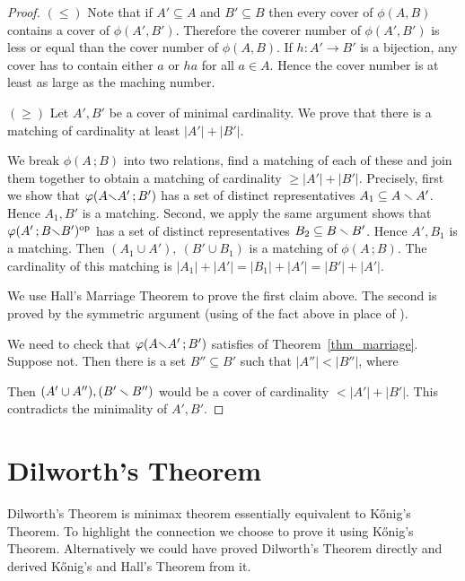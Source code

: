 \documentclass[scombinatorics.tex]{subfiles}
\begin{document}
\begin{proof}
  {\boldmath$(\le)$}
  Note that if $A'\subseteq A$ and $B'\subseteq B$ then every cover of $\phi(A,B)$ contains a cover of $\phi(A',B')$.
  Therefore the coverer number of $\phi(A',B')$ is less or equal than the cover number of $\phi(A,B)$.
  If $h:A'\to B'$ is a bijection, any cover has to contain either $a$ or $ha$ for all $a\in A$.
  Hence the cover number is at least as large as the maching number.

  {\boldmath$(\ge)$}
  Let $A',B'$ be a cover of minimal cardinality. 
  We prove that there is a matching of cardinality at least $|A'|+|B'|$.

  We break $\phi(A\,;B)$ into two relations, find a matching of each of these and join them together to obtain a matching of cardinality $\ge|A'|+|B'|$.
  Precisely, first we show that $\varphi(A{\smallsetminus} A'\,;B')$ has a set of distinct representatives $A_1\subseteq A\smallsetminus A'$.
  Hence $A_1,B'$ is a matching.
  Second, we apply the same argument shows that $\varphi(A'\,;B{\smallsetminus} B')^{\rm op}$ has a  set of distinct representatives $B_2\subseteq B\smallsetminus B'$.
  Hence $A',B_1$ is a matching.
  Then $(A_1\cup A'),\ (B'\cup B_1)$ is a matching of  $\phi(A\,;B)$.
  The cardinality of this matching is $|A_1|+|A'|=|B_1|+|A'|=|B'|+|A'|$.
  
  We use Hall's Marriage Theorem to prove the first claim above.
  The second is proved by the symmetric argument (using  of the fact above in place of ). 

  We need to check that $\varphi(A{\smallsetminus} A'\,;B')$ satisfies  of Theorem~\ref{thm_marriage}.
  Suppose not. Then there is a set $B''\subseteq B'$ such that $|A''|<|B''|$, where


  Then $(A'\cup A''), (B'\smallsetminus B'')$ would be a cover of cardinality $<|A'|+|B'|$.
  This contradicts the minimality of $A',B'$.
\end{proof}

\section{Dilworth's Theorem}\label{shadow}

Dilworth's Theorem is minimax theorem essentially equivalent to K\H{o}nig's Theorem.
To highlight the connection we choose to prove it using K\H{o}nig's Theorem. 
Alternatively we could have proved Dilworth's Theorem directly and derived K\H{o}nig's and Hall's Theorem from it.
\end{document}

